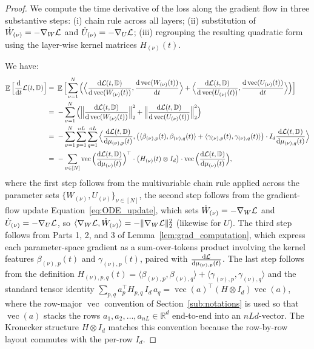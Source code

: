 \documentclass[11pt]{article}
\theoremstyle{plain}
\newcommand{\R}{\mathbb{R}}
\renewcommand{\d}{\mathrm{d}}
\DeclareMathOperator*{\E}{{\mathbb{E}}}
\DeclareMathOperator{\vect}{vec}
\begin{document}
\begin{proof}
    We compute the time derivative of the loss along the gradient flow in three substantive steps: (i) chain rule across all layers; (ii) substitution of $\dot W_{(\nu)} = -\nabla_W {\cal L}$ and $\dot U_{(\nu)} = -\nabla_U {\cal L}$; (iii) regrouping the resulting quadratic form using the layer-wise kernel matrices $H_{(\nu)}(t)$.

    We have:
    \begin{align*}
        \E\Big[\frac{\d }{\d t}{\cal L}(t, \mathbb{D})\Big]
        = & ~ \E\Big[\sum_{\nu=1}^N \Big(\Big\langle\frac{\d {\cal L}(t, \mathbb{D})}{\d \vect(W_{(\nu)}(t))}, \frac{\d \vect(W_{(\nu)}(t))}{\d t}\Big\rangle + \Big\langle\frac{\d {\cal L}(t, \mathbb{D})}{\d \vect(U_{(\nu)}(t))}, \frac{\d \vect(U_{(\nu)}(t))}{\d t}\Big\rangle\Big)\Big] \\
        = & ~ -\sum_{\nu=1}^N \Big(\Big\|\frac{\d {\cal L}(t, \mathbb{D})}{\d \vect(W_{(\nu)}(t))}\Big\|_2^2 + \Big\|\frac{\d {\cal L}(t, \mathbb{D})}{\d \vect(U_{(\nu)}(t))}\Big\|_2^2\Big) \\
        = &  ~- \sum_{\nu=1}^N \sum_{p=1}^{nL} \sum_{q=1}^{nL} \Big\langle \frac{\d {\cal L}(t, \mathbb{D})}{\d \mu_{(\nu), p}(t)}, \big(\langle \beta_{(\nu), p}(t), \beta_{(\nu), q}(t) \rangle + \langle \gamma_{(\nu), p}(t), \gamma_{(\nu), q}(t) \rangle \big) \cdot I_d \frac{\d {\cal L}(t, \mathbb{D})}{\d \mu_{(\nu), q}(t)} \Big\rangle \\
        = & ~ - \sum_{\nu \in [N]} \vect\Big(\frac{\d {\cal L}(t, \mathbb{D})}{\d \mu_{(\nu)}(t)}\Big)^\top \cdot \big( H_{(\nu)}(t) \otimes I_d \big) \cdot  \vect\Big(\frac{\d {\cal L}(t, \mathbb{D})}{\d \mu_{(\nu)}(t)}\Big),
    \end{align*}
    where the first step follows from the multivariable chain rule applied across the parameter sets $\{W_{(\nu)}, U_{(\nu)}\}_{\nu\in[N]}$, the second step follows from the gradient-flow update Equation~\eqref{eq:ODE_update}, which sets $\dot W_{(\nu)} = -\nabla_W {\cal L}$ and $\dot U_{(\nu)} = -\nabla_U {\cal L}$, so $\langle\nabla_W {\cal L}, \dot W_{(\nu)}\rangle = -\|\nabla_W {\cal L}\|_2^2$ (likewise for $U$). The third step follows from Parts 1, 2, and 3 of Lemma~\ref{lem:grad_computation}, which express each parameter-space gradient as a sum-over-tokens product involving the kernel features $\beta_{(\nu),p}(t)$ and $\gamma_{(\nu),p}(t)$, paired with $\frac{\d {\cal L}}{\d \mu_{(\nu),p}(t)}$. The last step follows from the definition $H_{(\nu),p,q}(t) = \langle\beta_{(\nu),p},\beta_{(\nu),q}\rangle + \langle\gamma_{(\nu),p},\gamma_{(\nu),q}\rangle$ and the standard tensor identity $\sum_{p,q} a_p^\top H_{p,q}\, I_d\, a_q = \vect(a)^\top (H\otimes I_d) \vect(a)$, where the row-major $\vect$ convention of Section~\ref{sub:notations} is used so that $\vect(a)$ stacks the rows $a_1, a_2, \dots, a_{nL}\in\R^d$ end-to-end into an $nLd$-vector. The Kronecker structure $H\otimes I_d$ matches this convention because the row-by-row layout commutes with the per-row $I_d$.
\end{proof}
\end{document}
